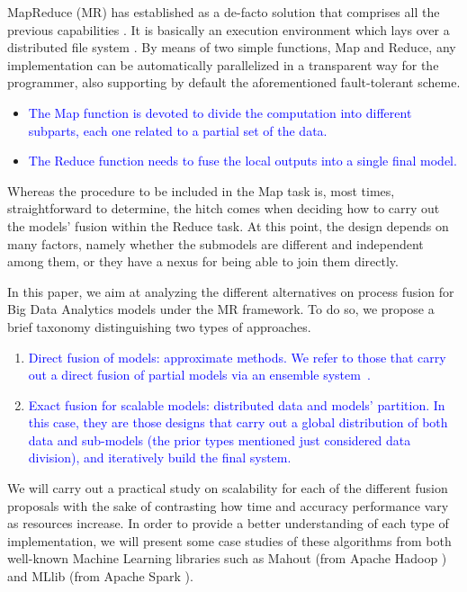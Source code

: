 \documentclass[3p,review]{elsarticle}
\begin{document}
	MapReduce (MR) has established as a de-facto solution that comprises all the previous capabilities \cite{Dea08,Dean10,Lee11-MR}. It is basically an execution environment which lays over a distributed file system \cite{Shvachko10-HDFS}. By means of two simple functions, Map and Reduce, any implementation can be automatically parallelized in a transparent way for the programmer, also supporting by default the aforementioned fault-tolerant scheme.
	\begin{itemize}
		\item \textcolor{blue}{The Map function is devoted to divide the computation into different subparts, each one related to a partial set of the data.}
		\item \textcolor{blue}{The Reduce function needs to fuse the local outputs into a single final model.}
	\end{itemize}
	
	Whereas the procedure to be included in the Map task is, most times, straightforward to determine, the hitch comes when deciding how to carry out the models' fusion within the Reduce task. At this point, the design depends on many factors, namely whether the submodels are different and independent among them, or they have a nexus for being able to join them directly. 
	
	In this paper, we aim at analyzing the different alternatives on process fusion  for Big Data Analytics models under the MR framework. To do so, we propose a brief taxonomy distinguishing two types of approaches. 
	\begin{enumerate}
		\item \textcolor{blue}{Direct fusion of models: approximate methods. We refer to those that carry out a direct fusion of partial models via an ensemble system~\cite{krawczyk17}. }
		\item \textcolor{blue}{Exact fusion for scalable models: distributed data and models' partition. In this case, they are those designs that carry out a global distribution of both data and sub-models (the prior types mentioned just considered data division), and iteratively build the final system.}
	\end{enumerate}
	
	
	We will carry out a practical study on scalability for each of the different fusion proposals with the sake of contrasting how time and accuracy performance vary as resources increase. In order to provide a better understanding of each type of implementation, we will present some case studies of these algorithms from both well-known Machine Learning libraries such as Mahout \cite{Owe11,Mahout17,Mahout16-Book} (from Apache Hadoop \cite{Lam11,Whi15-Hadoop}) and MLlib \cite{mllib15} (from Apache Spark \cite{Zaharia10,zaharia12}). 
	
\end{document}
